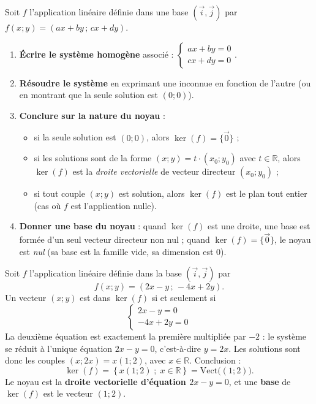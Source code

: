 \documentclass[11pt]{article}
\begin{document}
\begin{methode}
Soit $f$ l'application linéaire définie dans une base $(\vec{i}, \vec{j})$ par $f(x ; y) = (ax + by \,;\, cx + dy)$.
\begin{enumerate}
\item \textbf{Écrire le système homogène} associé : $\begin{cases} ax + by = 0 \\ cx + dy = 0 \end{cases}$.
\item \textbf{Résoudre le système} en exprimant une inconnue en fonction de l'autre (ou en montrant que la seule solution est $(0 ; 0)$).
\item \textbf{Conclure sur la nature du noyau} :
\begin{itemize}
\item si la seule solution est $(0 ; 0)$, alors $\ker(f) = \{\vec{0}\}$ ;
\item si les solutions sont de la forme $(x ; y) = t \cdot (x_0 ; y_0)$ avec $t \in \mathbb{R}$, alors $\ker(f)$ est la \emph{droite vectorielle} de vecteur directeur $(x_0 ; y_0)$ ;
\item si tout couple $(x ; y)$ est solution, alors $\ker(f)$ est le plan tout entier (cas où $f$ est l'application nulle).
\end{itemize}
\item \textbf{Donner une base du noyau} : quand $\ker(f)$ est une droite, une base est formée d'un seul vecteur directeur non nul ; quand $\ker(f) = \{\vec{0}\}$, le noyau est \emph{nul} (sa base est la famille vide, sa dimension est $0$).
\end{enumerate}
\end{methode}

\begin{exemplebox}
Soit $f$ l'application linéaire définie dans la base $(\vec{i}, \vec{j})$ par
\[
f(x ; y) = (2x - y \,;\, -4x + 2y).
\]
Un vecteur $(x ; y)$ est dans $\ker(f)$ si et seulement si
\[
\begin{cases} 2x - y = 0 \\ -4x + 2y = 0 \end{cases}
\]
La deuxième équation est exactement la première multipliée par $-2$ : le système se réduit à l'unique équation $2x - y = 0$, c'est-à-dire $y = 2x$. Les solutions sont donc les couples $(x ; 2x) = x(1 ; 2)$, avec $x \in \mathbb{R}$. Conclusion :
\[
\ker(f) = \left\{ x(1 ; 2) \; ; \; x \in \mathbb{R} \right\} = \mathrm{Vect}\big( (1 ; 2) \big).
\]
Le noyau est la \textbf{droite vectorielle d'équation $2x - y = 0$}, et une \textbf{base} de $\ker(f)$ est le vecteur $(1 ; 2)$.
\end{exemplebox}
\end{document}
